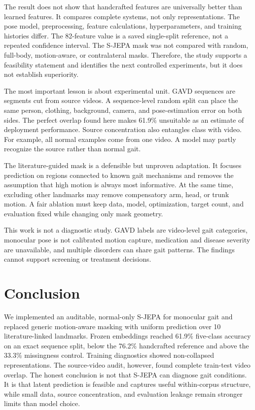 \documentclass[conference]{IEEEtran}
\begin{document}
The result does not show that handcrafted features are universally better than learned features. It compares complete systems, not only representations. The pose model, preprocessing, feature calculations, hyperparameters, and training histories differ. The 82-feature value is a saved single-split reference, not a repeated confidence interval. The S-JEPA mask was not compared with random, full-body, motion-aware, or contralateral masks. Therefore, the study supports a feasibility statement and identifies the next controlled experiments, but it does not establish superiority.

The most important lesson is about experimental unit. GAVD sequences are segments cut from source videos. A sequence-level random split can place the same person, clothing, background, camera, and pose-estimation error on both sides. The perfect overlap found here makes 61.9\% unsuitable as an estimate of deployment performance. Source concentration also entangles class with video. For example, all normal examples come from one video. A model may partly recognize the source rather than normal gait.

The literature-guided mask is a defensible but unproven adaptation. It focuses prediction on regions connected to known gait mechanisms and removes the assumption that high motion is always most informative. At the same time, excluding other landmarks may remove compensatory arm, head, or trunk motion. A fair ablation must keep data, model, optimization, target count, and evaluation fixed while changing only mask geometry.

This work is not a diagnostic study. GAVD labels are video-level gait categories, monocular pose is not calibrated motion capture, medication and disease severity are unavailable, and multiple disorders can share gait patterns. The findings cannot support screening or treatment decisions.

\section{Conclusion}
We implemented an auditable, normal-only S-JEPA for monocular gait and replaced generic motion-aware masking with uniform prediction over 10 literature-linked landmarks. Frozen embeddings reached 61.9\% five-class accuracy on an exact sequence split, below the 76.2\% handcrafted reference and above the 33.3\% missingness control. Training diagnostics showed non-collapsed representations. The source-video audit, however, found complete train-test video overlap. The honest conclusion is not that S-JEPA can diagnose gait conditions. It is that latent prediction is feasible and captures useful within-corpus structure, while small data, source concentration, and evaluation leakage remain stronger limits than model choice.
\end{document}
